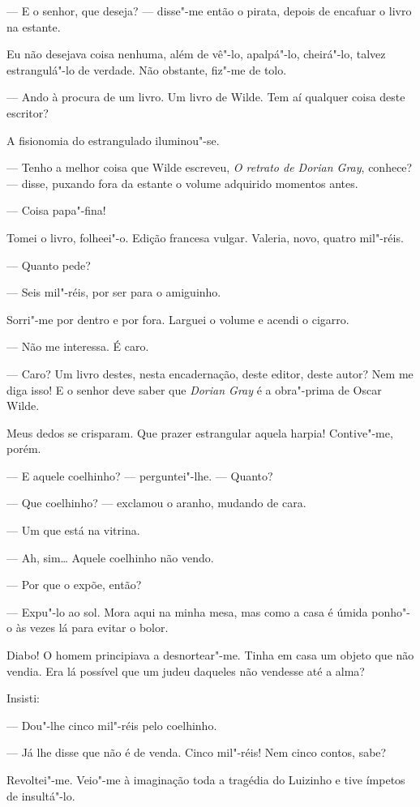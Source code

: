 --- E o senhor, que deseja? --- disse"-me então o pirata, depois de
encafuar o livro na estante.

Eu não desejava coisa nenhuma, além de vê"-lo, apalpá"-lo, cheirá"-lo,
talvez estrangulá"-lo de verdade. Não obstante, fiz"-me de tolo.

--- Ando à procura de um livro. Um livro de Wilde. Tem aí qualquer coisa
deste escritor?

A fisionomia do estrangulado iluminou"-se.

--- Tenho a melhor coisa que Wilde escreveu, \emph{O retrato de Dorian
Gray}, conhece? --- disse, puxando fora da estante o volume adquirido
momentos antes.

--- Coisa papa"-fina!

Tomei o livro, folheei"-o. Edição francesa vulgar. Valeria, novo, quatro
mil"-réis.

--- Quanto pede?

--- Seis mil"-réis, por ser para o amiguinho.

Sorri"-me por dentro e por fora. Larguei o volume e acendi o cigarro.

--- Não me interessa. É caro.

--- Caro? Um livro destes, nesta encadernação, deste editor, deste
autor? Nem me diga isso! E o senhor deve saber que \emph{Dorian Gray} é
a obra"-prima de Oscar Wilde.

Meus dedos se crisparam. Que prazer estrangular aquela harpia!
Contive"-me, porém.

--- E aquele coelhinho? --- perguntei"-lhe. --- Quanto?

--- Que coelhinho? --- exclamou o aranho, mudando de cara.

--- Um que está na vitrina.

--- Ah, sim\ldots{} Aquele coelhinho não vendo.

--- Por que o expõe, então?

--- Expu"-lo ao sol. Mora aqui na minha mesa, mas como a casa é úmida
ponho"-o às vezes lá para evitar o bolor.

Diabo! O homem principiava a desnortear"-me. Tinha em casa um objeto que
não vendia. Era lá possível que um judeu daqueles não vendesse até a
alma?

Insisti:

--- Dou"-lhe cinco mil"-réis pelo coelhinho.

--- Já lhe disse que não é de venda. Cinco mil"-réis! Nem cinco contos,
sabe?

Revoltei"-me. Veio"-me à imaginação toda a tragédia do Luizinho e tive
ímpetos de insultá"-lo.

